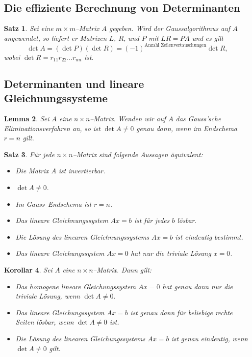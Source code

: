 \documentclass[9pt,fleqn,ngerman,article]{memoir}
\newtheorem{lemma}{Lemma}[section]
\newtheorem{satz}[lemma]{Satz}
\newtheorem{korollar}[lemma]{Korollar}
\begin{document}
\begin{multicols*}{3}
		
		\subsection{Die effiziente Berechnung von Determinanten} %
			\begin{satz}
				Sei eine $m \times m$--Matrix $A$ gegeben. Wird der Gaussalgorithmus auf $A$ angewendet, so liefert er Matrizen $L$, $R$, und $P$ mit $LR = PA$ und es gilt
				\[
					\det A = (\det P)(\det R) = (-1)^{\text{Anzahl Zeilenvertauschungen}} \det R,
				\]
				wobei $\det R = r_{11} r_{22} \dots r_{nn}$ ist.
			\end{satz}
			
		
		\subsection{Determinanten und lineare Gleichnungssysteme} %
			
			\begin{lemma}
				Sei $A$ eine $n \times n$--Matrix. Wenden wir auf $A$ das Gauss'sche Eliminationsverfahren an, so ist $\det A \neq 0$ genau dann, wenn im Endschema $r = n$ gilt.
			\end{lemma}
			
			\begin{satz}
				Für jede $n \times n$--Matrix sind folgende Aussagen äquivalent:
				\begin{itemize}
					\item[i)] Die Matrix $A$ ist invertierbar.
					\item[ii)] $\det A \neq 0$.
					\item[iii)] Im Gauss--Endschema ist $r = n$.
					\item[iv)] Das lineare Gleichnungssystem $Ax = b$ ist für jedes $b$ lösbar.
					\item[v)] Die Lösung des linearen Gleichnungssystems $Ax = b$ ist eindeutig bestimmt.
					\item[vi)] Das lineare Gleichungssystem $Ax = 0$ hat nur die triviale Lösung $x = 0$.
				\end{itemize}
			\end{satz}
			
			\begin{korollar}
				Sei $A$ eine $n \times n$--Matrix. Dann gilt:
				\begin{itemize}
					\item[i)] Das homogene lineare Gleichungssystem $Ax = 0$ hat genau dann nur die triviale Lösung, wenn $\det A \neq 0$.
					\item[ii)] Das lineare Gleichungssystem $Ax = b$ ist genau dann für beliebige rechte Seiten lösbar, wenn $\det A \neq 0$ ist.
					\item[iii)] Die Lösung des linearen Gleichungssystems $Ax = b$ ist genau eindeutig, wenn $\det A \neq 0$ gilt.
				\end{itemize}
			\end{korollar}
			

\end{multicols*}
\end{document}
